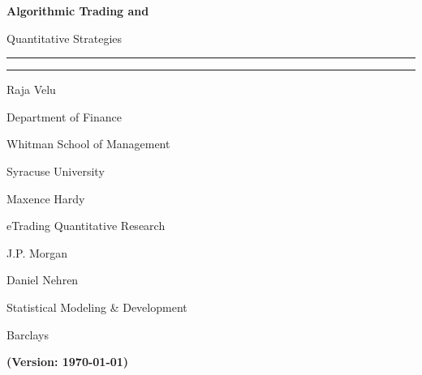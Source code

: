 {\bfseries\Huge Algorithmic Trading and \par Quantitative Strategies}

\noindent\rule{\textwidth}{0.5pt} \par
\vspace{-0.3cm}\noindent\rule{0.25\textwidth}{4pt}

\vspace{0.5cm} 
\begin{minipage}{0.3\textwidth}
\large Raja Velu \par
{\scriptsize
Department of Finance \par
Whitman School of Management \par
Syracuse University \par
}
\end{minipage}%
\begin{minipage}{0.3\textwidth}
\large Maxence Hardy \par
{\scriptsize
eTrading Quantitative Research \par
J.P. Morgan \par
}
\end{minipage}%
\begin{minipage}{0.35\textwidth}
\large Daniel Nehren \par
{\scriptsize
Statistical Modeling \& Development \par 
Barclays \par
}
\end{minipage}

\vfill
\begin{center} \Huge {\bfseries (Version: \today)} \end{center}

















